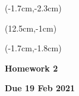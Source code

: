 \documentclass[12pt, oneside]{article}
\begin{document}
\begin{textblock*}{4cm}(-1.7cm,-2.3cm)
\end{textblock*}

\begin{textblock*}{8cm}(12.5cm,-1cm)
\end{textblock*}
\begin{textblock*}{13.5cm}(-1.7cm,-1.8cm)
\end{textblock*}

\vspace{1cm}

\begin{center}
\textbf{\Large Homework 2}

\textbf{Due 19 Feb 2021}
\end{center}
\end{document}
